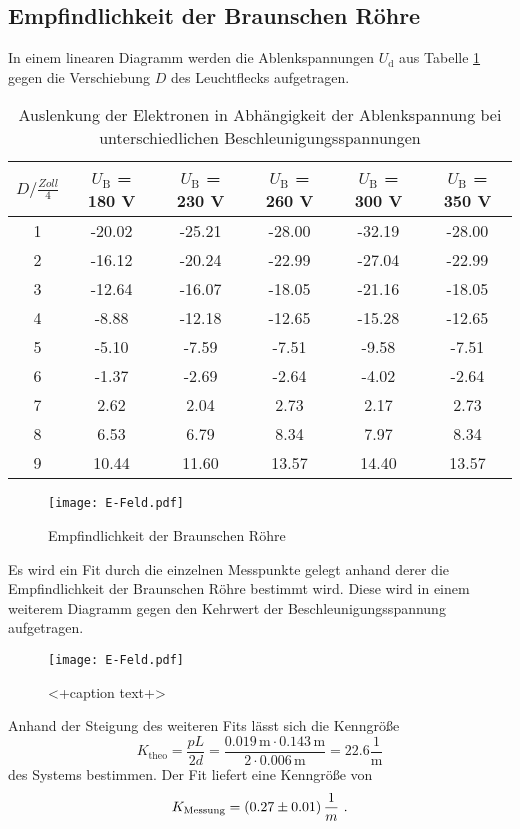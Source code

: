 \subsection{Empfindlichkeit der Braunschen Röhre}
In einem linearen Diagramm werden die Ablenkspannungen $U_\text{d}$ aus Tabelle \ref{tab:DIS} gegen die Verschiebung $D$ des Leuchtflecks aufgetragen.
\begin{table}
  \centering
  \begin{tabular}{c| c c c c c }
    \toprule
    $D / \frac{Zoll}{4}$ & $U_\text{B}$ = 180 V & $U_\text{B}$ = 230 V & $U_\text{B}$ = 260 V & $U_\text{B}$ = 300 V & $U_\text{B}$ = 350 V \\
    \midrule
    1 &	-20.02	&-25.21	&-28.00	&-32.19	&-28.00	\\
    2 &	-16.12	&-20.24	&-22.99	&-27.04	&-22.99	\\
    3 &	-12.64	&-16.07	&-18.05	&-21.16	&-18.05	\\
    4 &	-8.88	&-12.18	&-12.65	&-15.28	&-12.65	\\
    5 &	-5.10	&-7.59	&-7.51	&-9.58	&-7.51	\\
    6 &	-1.37	&-2.69	&-2.64	&-4.02	&-2.64	\\
    7 &	2.62	&2.04	&2.73	&2.17	&2.73	\\
    8 &	6.53	&6.79	&8.34	&7.97	&8.34	\\
    9 &	10.44	&11.60	&13.57	&14.40	&13.57	\\
    \bottomrule
  \end{tabular}
  \caption{Auslenkung der Elektronen in Abhängigkeit der Ablenkspannung bei unterschiedlichen Beschleunigungsspannungen}
  \label{tab:DIS}
\end{table}
\begin{figure}
  \centering
  \texttt{[image: E-Feld.pdf]}
  \caption{Empfindlichkeit der Braunschen Röhre}
  \label{fig:empf}
\end{figure}
Es wird ein Fit durch die einzelnen Messpunkte gelegt anhand derer die Empfindlichkeit der Braunschen Röhre bestimmt wird. Diese wird in einem weiterem Diagramm gegen den Kehrwert der Beschleunigungsspannung aufgetragen.
\begin{figure}
  \centering
  \texttt{[image: E-Feld.pdf]}
  \caption{<+caption text+>}
  \label{fig:<+label+>}
\end{figure}
Anhand der Steigung des weiteren Fits lässt sich die Kenngröße
\begin{equation}
  K_\text{theo} = \frac{p L}{2 d} = \frac{0.019 \, \text{m} \cdot 0.143 \, \text{m}}{2 \cdot 0.006 \, \text{m}} = 22.6 \frac{1}{\text{m}}
  \label{eqn:Ktheo}
\end{equation}
des Systems bestimmen. Der Fit liefert eine Kenngröße von
\begin{equation}
  K_\text{Messung} = (\num{0.27 +- 0.01}) \, \frac{1}{m} \ .
  \label{Kmess}
\end{equation}
